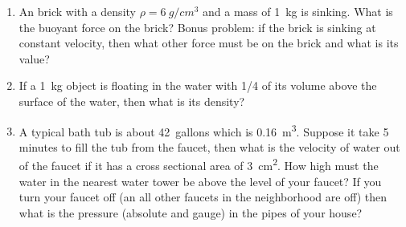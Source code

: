 \begin{enumerate}
\item An brick with a density $\rho = \SI{6}{g/cm^3}$ and a mass of \SI{1}{kg} is sinking. What is the buoyant force on the brick? Bonus problem: if the brick is sinking at constant velocity, then what other force must be on the brick and what is its value? 
\hugeskip

\item If a \SI{1}{kg} object is floating in the water with 1/4 of its volume above the surface of the water, then what is its density? 
\hugeskip

\item A typical bath tub is about \SI{42}{gallons} which is \SI{0.16}{m^3}. Suppose it take 5 minutes to fill the tub from the faucet, then what is the velocity of water out of the faucet if it has a cross sectional area of \SI{3}{cm^2}. How high must the water in the nearest water tower be above the level of your faucet? If you turn your faucet off (an all other faucets in the neighborhood are off) then what is the pressure (absolute and gauge) in the pipes of your house?

\end{enumerate}